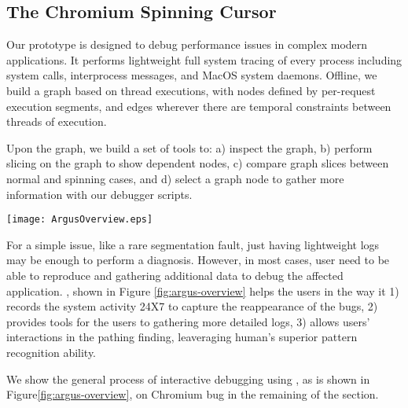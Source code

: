 \subsection{The Chromium Spinning Cursor}


Our \xxx prototype is designed to debug performance issues in complex modern applications.
It performs lightweight full system tracing of every process including system calls,
interprocess messages, and MacOS system daemons.
Offline, we build a graph based on thread executions, with nodes defined by
per-request execution segments,
and edges wherever there are temporal constraints between threads of execution.

Upon the graph, we build a set of tools to:
a) inspect the graph,
b) perform slicing on the graph to show dependent nodes,
c) compare graph slices between normal and spinning cases, and
d) select a graph node to gather more information with our debugger scripts.

\begin{figure*}[tb]
    \centering
    \texttt{[image: ArgusOverview.eps]}
    \caption{Design Overview}
    \label{fig:argus-overview}
\end{figure*}

For a simple issue, like a rare segmentation fault,
just having lightweight logs may be enough to perform a diagnosis.
However, in most cases, user need to be able to reproduce and gathering
additional data to debug the affected application.
\xxx, shown in Figure \ref{fig:argus-overview} helps the users in the way
it 1) records the system activity 24X7 to capture the reappearance of the bugs,
2) provides tools for the users to gathering more detailed logs,
3) allows users' interactions in the pathing finding,
leaveraging human's superior pattern recognition ability.

We show the general process of interactive debugging using \xxx,
as is shown in Figure\ref{fig:argus-overview},
on Chromium bug in the remaining of the section.

